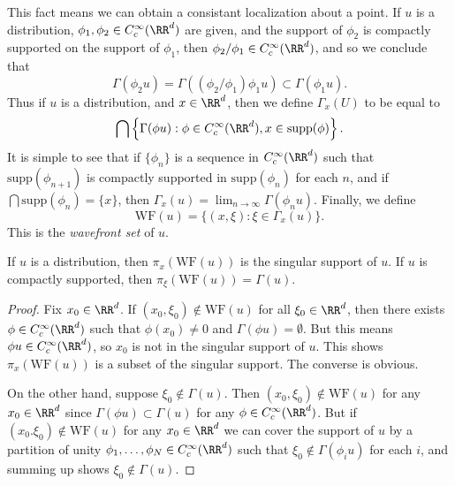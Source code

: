 This fact means we can obtain a consistant localization about a point. If $u$ is a distribution, $\phi_1,\phi_2 \in C_c^\infty(\RR^d)$ are given, and the support of $\phi_2$ is compactly supported on the support of $\phi_1$, then $\phi_2/\phi_1 \in C_c^\infty(\RR^d)$, and so we conclude that
%
\[ \Gamma(\phi_2 u) = \Gamma((\phi_2/\phi_1) \phi_1 u) \subset \Gamma(\phi_1 u). \]
%
Thus if $u$ is a distribution, and $x \in \RR^d$, then we define $\Gamma_x(U)$ to be equal to
%
\[ \bigcap \left\{ \Gamma(\phi u) : \phi \in C_c^\infty(\RR^d), x \in \text{supp}(\phi) \right\}. \]
%
It is simple to see that if $\{ \phi_n \}$ is a sequence in $C_c^\infty(\RR^d)$ such that $\text{supp}(\phi_{n+1})$ is compactly supported in $\text{supp}(\phi_n)$ for each $n$, and if $\bigcap \text{supp}(\phi_n) = \{ x \}$, then $\Gamma_x(u) = \lim_{n \to \infty} \Gamma(\phi_n u)$. Finally, we define
%
\[ \text{WF}(u) = \{ (x,\xi): \xi \in \Gamma_x(u) \}. \]
%
This is the \emph{wavefront set} of $u$.

\begin{lemma}
    If $u$ is a distribution, then $\pi_x(\text{WF}(u))$ is the singular support of $u$. If $u$ is compactly supported, then $\pi_\xi(\text{WF}(u)) = \Gamma(u)$.
\end{lemma}
\begin{proof}
    Fix $x_0 \in \RR^d$. If $(x_0,\xi_0) \not \in \text{WF}(u)$ for all $\xi_0 \in \RR^d$, then there exists $\phi \in C_c^\infty(\RR^d)$ such that $\phi(x_0) \neq 0$ and $\Gamma(\phi u) = \emptyset$. But this means $\phi u \in C_c^\infty(\RR^d)$, so $x_0$ is not in the singular support of $u$. This shows $\pi_x(\text{WF}(u))$ is a subset of the singular support. The converse is obvious.

    On the other hand, suppose $\xi_0 \not \in \Gamma(u)$. Then $(x_0,\xi_0) \not \in \text{WF}(u)$ for any $x_0 \in \RR^d$ since $\Gamma(\phi u) \subset \Gamma(u)$ for any $\phi \in C_c^\infty(\RR^d)$. But if $(x_0.\xi_0) \not \in \text{WF}(u)$ for any $x_0 \in \RR^d$ we can cover the support of $u$ by a partition of unity $\phi_1,\dots,\phi_N \in C_c^\infty(\RR^d)$ such that $\xi_0 \not \in \Gamma(\phi_i u)$ for each $i$, and summing up shows $\xi_0 \not \in \Gamma(u)$.
\end{proof}


